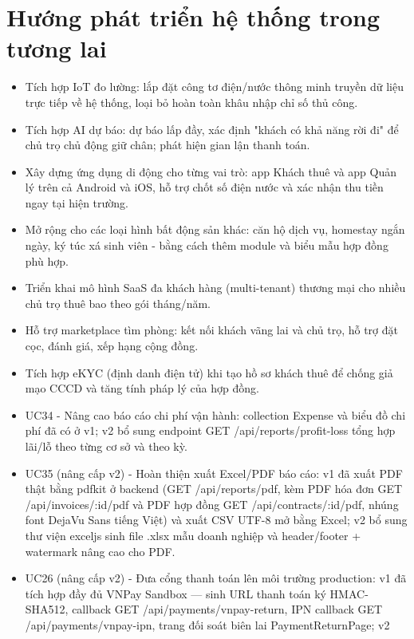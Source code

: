 \documentclass[a4paper,oneside]{report}
\begin{document}
\section{Hướng phát triển hệ thống trong tương lai}

\begin{itemize}
\item
  Tích hợp IoT đo lường: lắp đặt công tơ điện/nước thông minh truyền dữ
  liệu trực tiếp về hệ thống, loại bỏ hoàn toàn khâu nhập chỉ số thủ
  công.
\item
  Tích hợp AI dự báo: dự báo lấp đầy, xác định "khách có khả năng rời
  đi" để chủ trọ chủ động giữ chân; phát hiện gian lận thanh toán.
\item
  Xây dựng ứng dụng di động cho từng vai trò: app Khách thuê và app Quản
  lý trên cả Android và iOS, hỗ trợ chốt số điện nước và xác nhận thu
  tiền ngay tại hiện trường.
\item
  Mở rộng cho các loại hình bất động sản khác: căn hộ dịch vụ, homestay
  ngắn ngày, ký túc xá sinh viên - bằng cách thêm module và biểu mẫu hợp
  đồng phù hợp.
\item
  Triển khai mô hình SaaS đa khách hàng (multi-tenant) thương mại cho
  nhiều chủ trọ thuê bao theo gói tháng/năm.
\item
  Hỗ trợ marketplace tìm phòng: kết nối khách vãng lai và chủ trọ, hỗ
  trợ đặt cọc, đánh giá, xếp hạng cộng đồng.
\item
  Tích hợp eKYC (định danh điện tử) khi tạo hồ sơ khách thuê để chống
  giả mạo CCCD và tăng tính pháp lý của hợp đồng.
\item
  UC34 - Nâng cao báo cáo chi phí vận hành: collection Expense và biểu
  đồ chi phí đã có ở v1; v2 bổ sung endpoint GET
  /api/reports/profit-loss tổng hợp lãi/lỗ theo từng cơ sở và theo kỳ.
\item
  UC35 (nâng cấp v2) - Hoàn thiện xuất Excel/PDF báo cáo: v1 đã xuất PDF
  thật bằng pdfkit ở backend (GET /api/reports/pdf, kèm PDF hóa đơn GET
  /api/invoices/:id/pdf và PDF hợp đồng GET /api/contracts/:id/pdf,
  nhúng font DejaVu Sans tiếng Việt) và xuất CSV UTF-8 mở bằng Excel; v2
  bổ sung thư viện exceljs sinh file .xlsx mẫu doanh nghiệp và
  header/footer + watermark nâng cao cho PDF.
\item
  UC26 (nâng cấp v2) - Đưa cổng thanh toán lên môi trường production: v1
  đã tích hợp đầy đủ VNPay Sandbox --- sinh URL thanh toán ký
  HMAC-SHA512, callback GET /api/payments/vnpay-return, IPN callback GET
  /api/payments/vnpay-ipn, trang đối soát biên lai PaymentReturnPage; v2

\end{itemize}
\end{document}
